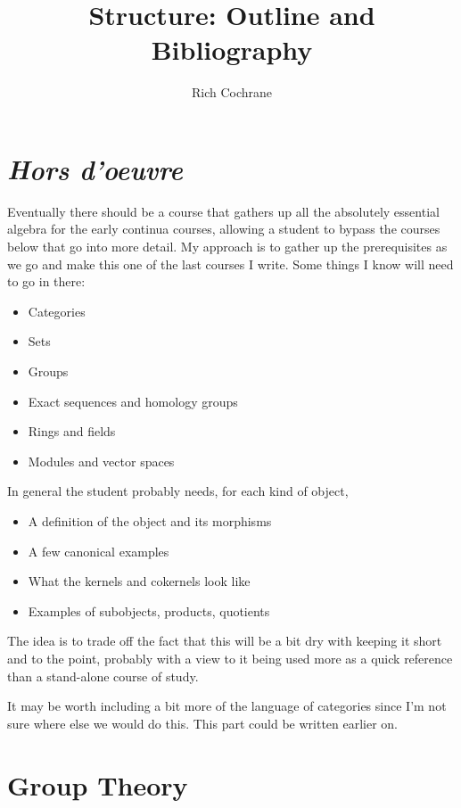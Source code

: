 \documentclass[article]{article}
\begin{document}
\title{Structure: Outline and Bibliography}
\author{Rich Cochrane}
\maketitle

\section{\textit{Hors d'oeuvre}}

Eventually there should be a course that gathers up all the absolutely essential algebra for the early continua courses, allowing a student to bypass the courses below that go into more detail. My approach is to gather up the prerequisites as we go and make this one of the last courses I write. Some things I know will need to go in there:

\begin{itemize}
	\item{Categories}
	\item{Sets}
	\item{Groups}
	\item{Exact sequences and homology groups}
	\item{Rings and fields}
	\item{Modules and vector spaces}
\end{itemize}

In general the student probably needs, for each kind of object,

\begin{itemize}
	\item{A definition of the object and its morphisms}
	\item{A few canonical examples}
	\item{What the kernels and cokernels look like}
	\item{Examples of subobjects, products, quotients}
\end{itemize}

The idea is to trade off the fact that this will be a bit dry with keeping it short and to the point, probably with a view to it being used more as a quick reference than a stand-alone course of study.

It may be worth including a bit more of the language of categories since I'm not sure where else we would do this. This part could be written earlier on.

\section{Group Theory}
\end{document}
